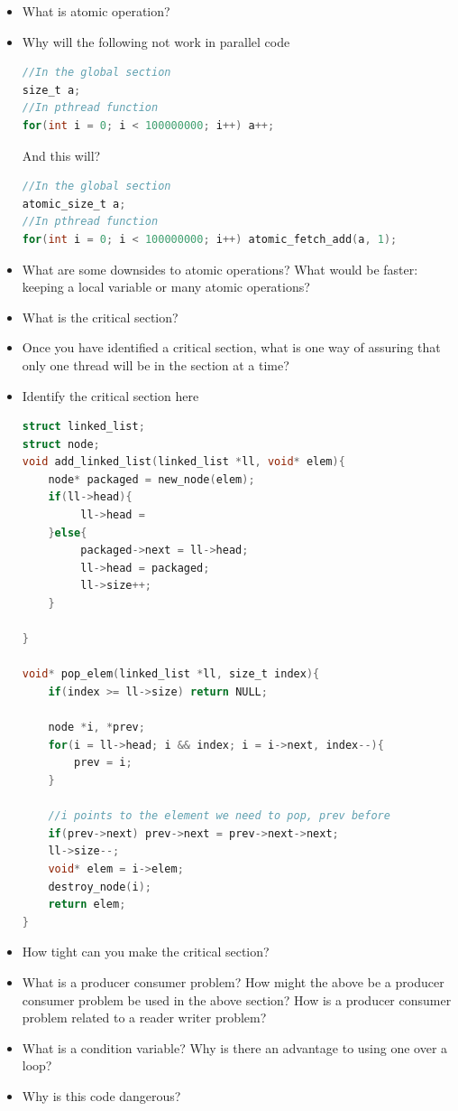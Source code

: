 \begin{itemize}
\tightlist
\item
  What is atomic operation?
\item
  Why will the following not work in parallel code

\begin{lstlisting}[language=C]
//In the global section
size_t a;
//In pthread function
for(int i = 0; i < 100000000; i++) a++;
\end{lstlisting}

  And this will?

\begin{lstlisting}[language=C]
//In the global section
atomic_size_t a;
//In pthread function
for(int i = 0; i < 100000000; i++) atomic_fetch_add(a, 1);
\end{lstlisting}
\item
  What are some downsides to atomic operations? What would be faster: keeping a local variable or many atomic operations?
\item
  What is the critical section?
\item
  Once you have identified a critical section, what is one way of assuring that only one thread will be in the section at a time?
\item
  Identify the critical section here

\begin{lstlisting}[language=C]
struct linked_list;
struct node;
void add_linked_list(linked_list *ll, void* elem){
    node* packaged = new_node(elem);
    if(ll->head){
         ll->head = 
    }else{
         packaged->next = ll->head;
         ll->head = packaged;
         ll->size++;
    }
    
}

void* pop_elem(linked_list *ll, size_t index){
    if(index >= ll->size) return NULL;
    
    node *i, *prev;
    for(i = ll->head; i && index; i = i->next, index--){
        prev = i;
    }

    //i points to the element we need to pop, prev before
    if(prev->next) prev->next = prev->next->next;
    ll->size--;
    void* elem = i->elem;
    destroy_node(i);
    return elem;
}
\end{lstlisting}

\item How tight can you make the critical section? 
\item What is a producer consumer problem? How might the above be a producer consumer problem be used in the above section? How is a producer consumer problem related to a reader writer problem? 
\item What is a condition variable? Why is there an advantage to using one over a  loop? 
\item Why is this code dangerous?


\end{itemize}
